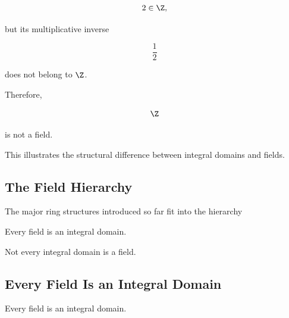 \[ 2\in\Z, \]

but its multiplicative inverse

\[ \frac12 \]

does not belong to \(\Z\).

Therefore,

\[ \Z \]

is not a field.

This illustrates the structural difference between integral domains and
fields.

\subsection{The Field Hierarchy}
\label{subsec:field-hierarchy}

The major ring structures introduced so far fit into the hierarchy

\begin{center}
\end{center}

Every field is an integral domain.

Not every integral domain is a field.

\subsection{Every Field Is an Integral Domain}
\label{subsec:field-integral-domain}

\begin{theorem}
Every field is an integral domain.
\end{theorem}

